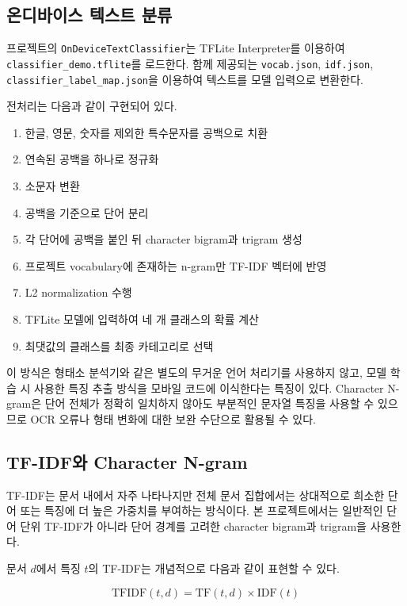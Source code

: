 \documentclass[11pt,a4paper]{article}
\begin{document}
\subsection{온디바이스 텍스트 분류}

프로젝트의 \texttt{OnDeviceTextClassifier}는 TFLite Interpreter를 이용하여 \texttt{classifier\_demo.tflite}를 로드한다. 함께 제공되는 \texttt{vocab.json}, \texttt{idf.json}, \texttt{classifier\_label\_map.json}을 이용하여 텍스트를 모델 입력으로 변환한다.

전처리는 다음과 같이 구현되어 있다.

\begin{enumerate}
    \item 한글, 영문, 숫자를 제외한 특수문자를 공백으로 치환
    \item 연속된 공백을 하나로 정규화
    \item 소문자 변환
    \item 공백을 기준으로 단어 분리
    \item 각 단어에 공백을 붙인 뒤 character bigram과 trigram 생성
    \item 프로젝트 vocabulary에 존재하는 n-gram만 TF-IDF 벡터에 반영
    \item L2 normalization 수행
    \item TFLite 모델에 입력하여 네 개 클래스의 확률 계산
    \item 최댓값의 클래스를 최종 카테고리로 선택
\end{enumerate}

이 방식은 형태소 분석기와 같은 별도의 무거운 언어 처리기를 사용하지 않고, 모델 학습 시 사용한 특징 추출 방식을 모바일 코드에 이식한다는 특징이 있다. Character N-gram은 단어 전체가 정확히 일치하지 않아도 부분적인 문자열 특징을 사용할 수 있으므로 OCR 오류나 형태 변화에 대한 보완 수단으로 활용될 수 있다\cite{ref_ondevice_classification}.

\subsection{TF-IDF와 Character N-gram}

TF-IDF는 문서 내에서 자주 나타나지만 전체 문서 집합에서는 상대적으로 희소한 단어 또는 특징에 더 높은 가중치를 부여하는 방식이다. 본 프로젝트에서는 일반적인 단어 단위 TF-IDF가 아니라 단어 경계를 고려한 character bigram과 trigram을 사용한다.

문서 $d$에서 특징 $t$의 TF-IDF는 개념적으로 다음과 같이 표현할 수 있다.

\[
\mathrm{TFIDF}(t,d)=\mathrm{TF}(t,d)\times \mathrm{IDF}(t)
\]
\end{document}
